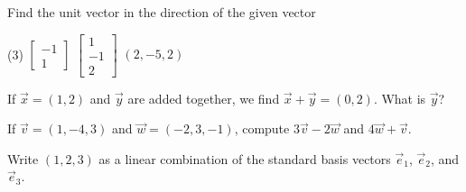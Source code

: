 \documentclass{ximera}
\begin{document}
\begin{exercise}%
    Find the unit vector in the direction of the given vector
    \begin{tasks}(3)
        \task 
        $\begin{bmatrix}
            -1 \\
            1 
        \end{bmatrix}$
        \task
        $\begin{bmatrix}
            1 \\
            -1 \\
            2
        \end{bmatrix}$
        \task $(2,-5,2)$
    \end{tasks}
\end{exercise}

\begin{exercise}
    If $\vec{x} = (1,2)$ and $\vec{y}$ are added together, we find $\vec{x}+\vec{y} = (0,2)$.  What is $\vec{y}$?
\end{exercise}

\begin{exercise}
    If $\vec{v} = (1, -4, 3)$ and $\vec{w} = (-2, 3, -1)$, compute $3\vec{v} - 2\vec{w}$ and $4\vec{w} + \vec{v}$. 
\end{exercise}

\begin{exercise}
    Write $(1,2,3)$ as a linear combination of the standard basis vectors $\vec{e}_1$, $\vec{e}_2$, and $\vec{e}_3$.
\end{exercise}
\end{document}
